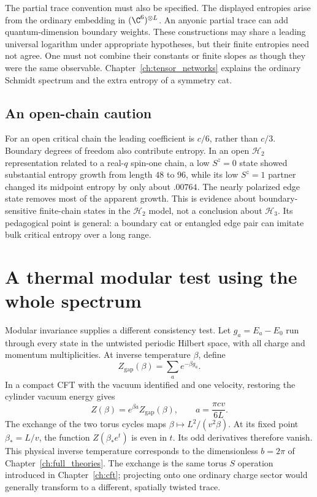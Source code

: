 The partial trace convention must also be specified. The displayed
entropies arise from the ordinary embedding in $(\C^6)^{\otimes L}$.
An anyonic partial trace can add quantum-dimension boundary weights.
These constructions may share a leading universal logarithm under
appropriate hypotheses, but their finite entropies need not agree. One
must not combine their constants or finite slopes as though they were
the same observable.
Chapter~\ref{ch:tensor_networks} explains the ordinary Schmidt spectrum
and the extra entropy of a symmetry cat.

\subsection{An open-chain caution}

For an open critical chain the leading coefficient is $c/6$, rather
than $c/3$. Boundary degrees of freedom also contribute entropy. In an
open $\mathcal H_2$ representation related to a real-$q$ spin-one chain, a low
$S^z=0$ state showed substantial entropy growth from length $48$ to
$96$, while its low $S^z=1$ partner changed its midpoint entropy by
only about $.00764$. The nearly polarized edge state removes most of
the apparent growth. This is evidence about boundary-sensitive
finite-chain states in the $\mathcal H_2$ model, not a conclusion about $\mathcal H_3$.
Its pedagogical point is general: a boundary cat or entangled edge pair
can imitate bulk critical entropy over a long range.

\section{A thermal modular test using the whole spectrum}

Modular invariance supplies a different consistency test. Let
$g_a=E_a-E_0$ run through every state in the untwisted periodic
Hilbert space, with all charge and momentum multiplicities. At
inverse temperature $\beta$, define
\[
 Z_{\mathrm{gap}}(\beta)=\sum_a e^{-\beta g_a}.
\]
In a compact CFT with the vacuum identified and one velocity,
restoring the cylinder vacuum energy gives
\[
 Z(\beta)=e^{\beta a}Z_{\mathrm{gap}}(\beta),\qquad
 a=\frac{\pi cv}{6L}.
\]
The exchange of the two torus cycles maps
$\beta\mapsto L^2/(v^2\beta)$. At its fixed point
$\beta_*=L/v$, the function $Z(\beta_*e^t)$ is even in $t$. Its odd
derivatives therefore vanish.
This physical inverse temperature corresponds to the dimensionless
$b=2\pi$ of Chapter~\ref{ch:full_theories}.
The exchange is the same torus $S$ operation introduced in
Chapter~\ref{ch:cft}; projecting onto one ordinary charge sector
would generally transform to a different, spatially twisted trace.

